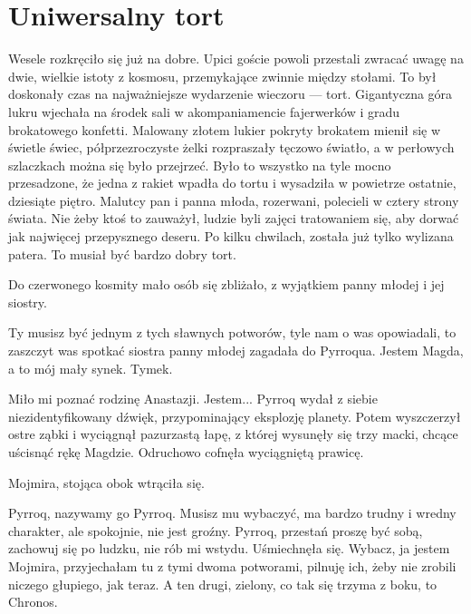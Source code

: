 \chapter{Uniwersalny tort}



Wesele rozkręciło się już na dobre. 
Upici goście powoli przestali zwracać uwagę na dwie, wielkie istoty z kosmosu, przemykające zwinnie między stołami.
To był doskonały czas na najważniejsze wydarzenie wieczoru --- tort.
Gigantyczna góra lukru wjechała na środek sali w akompaniamencie fajerwerków i gradu brokatowego konfetti. 
Malowany złotem lukier pokryty brokatem mienił się w świetle świec, półprzezroczyste żelki rozpraszały tęczowo światło, a w perłowych szlaczkach można się było przejrzeć.
Było to wszystko na tyle mocno przesadzone, że jedna z rakiet wpadła do tortu i wysadziła w powietrze ostatnie, dziesiąte piętro.
Malutcy pan i panna młoda, rozerwani, polecieli w cztery strony świata.
Nie żeby ktoś to zauważył, ludzie byli zajęci tratowaniem się, aby dorwać jak najwięcej przepysznego deseru. 
Po kilku chwilach, została już tylko wylizana patera. To musiał być bardzo dobry tort.

Do czerwonego kosmity mało osób się zbliżało, z wyjątkiem panny młodej i jej siostry.

\ds{} Ty musisz być jednym z tych sławnych potworów, tyle nam o was opowiadali, to zaszczyt was spotkać \dm{} siostra panny młodej zagadała do Pyrroqua. \dm{}
Jestem Magda, a to mój mały synek. Tymek. \de{}

\ds{} Miło mi poznać rodzinę Anastazji. Jestem... \dm{} Pyrroq wydał z siebie niezidentyfikowany dźwięk, przypominający eksplozję planety.
Potem wyszczerzył ostre ząbki i wyciągnął pazurzastą łapę, z której wysunęły się trzy macki, chcące uścisnąć rękę Magdzie. Odruchowo cofnęła wyciągniętą prawicę. \de{}

Mojmira, stojąca obok wtrąciła się.

\ds{} Pyrroq, nazywamy go Pyrroq. Musisz mu wybaczyć, ma bardzo trudny i wredny charakter, ale spokojnie, nie jest groźny. 
Pyrroq, przestań proszę być sobą, zachowuj się po ludzku, nie rób mi wstydu.
\dm{} Uśmiechnęła się. \dm{}
Wybacz, ja jestem Mojmira, przyjechałam tu z tymi dwoma potworami, pilnuję ich, żeby nie zrobili niczego głupiego, jak teraz. 
A ten drugi, zielony, co tak się trzyma z boku, to Chronos. \de{}

